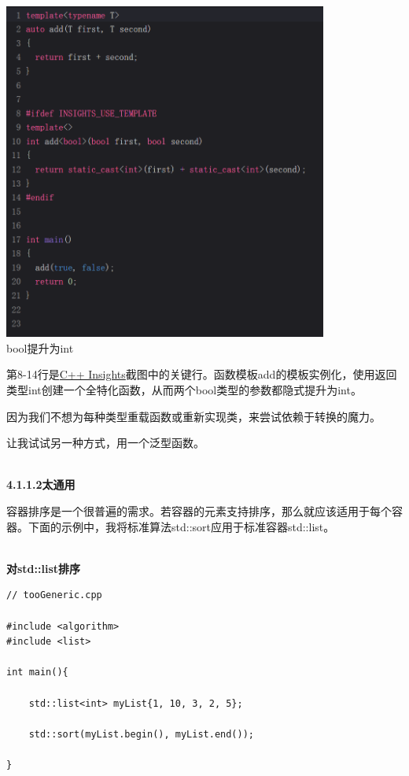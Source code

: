 \begin{center}
\includegraphics[width=0.8\textwidth]{content/3/chapter4/images/1-1.png}\\
bool提升为int
\end{center}

第8-14行是\href{https://cppinsights.io/}{C++ Insights}截图中的关键行。函数模板add的模板实例化，使用返回类型int创建一个全特化函数，从而两个bool类型的参数都隐式提升为int。

因为我们不想为每种类型重载函数或重新实现类，来尝试依赖于转换的魔力。

让我试试另一种方式，用一个泛型函数。

\hspace*{\fill} \\ %
\noindent
\textbf{4.1.1.2\hspace{0.2cm}太通用}

容器排序是一个很普遍的需求。若容器的元素支持排序，那么就应该适用于每个容器。下面的示例中，我将标准算法std::sort应用于标准容器std::list。

\hspace*{\fill} \\ %
\noindent
\textbf{对std::list排序}
\begin{lstlisting}[style=styleCXX]
// tooGeneric.cpp

#include <algorithm>
#include <list>

int main(){

	std::list<int> myList{1, 10, 3, 2, 5};

	std::sort(myList.begin(), myList.end());

}
\end{lstlisting}


